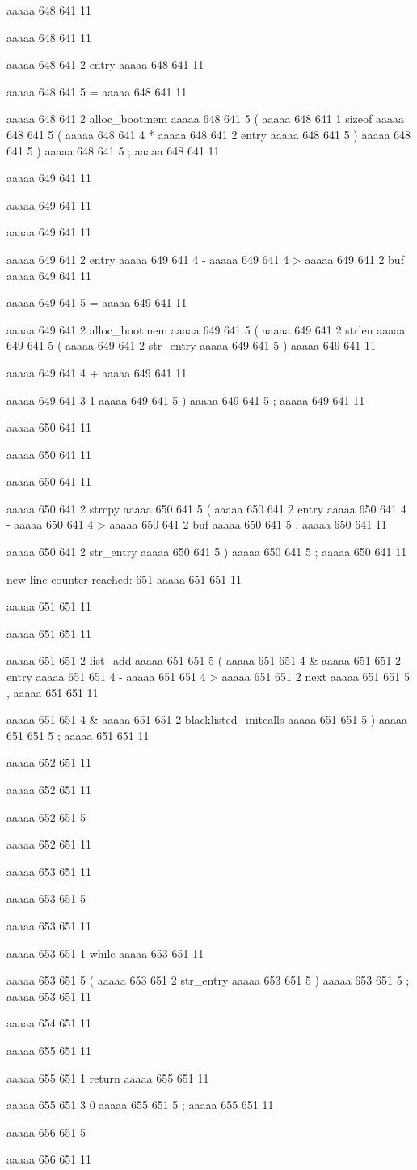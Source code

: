 {{{aaaaa 648 641
11
	
aaaaa 648 641
11
	
aaaaa 648 641
2
entry
aaaaa 648 641
11
 
aaaaa 648 641
5
=
aaaaa 648 641
11
 
aaaaa 648 641
2
alloc_bootmem
aaaaa 648 641
5
(
aaaaa 648 641
1
sizeof
aaaaa 648 641
5
(
aaaaa 648 641
4
*
aaaaa 648 641
2
entry
aaaaa 648 641
5
)
aaaaa 648 641
5
)
aaaaa 648 641
5
;
aaaaa 648 641
11


aaaaa 649 641
11
	
aaaaa 649 641
11
	
aaaaa 649 641
11
	
aaaaa 649 641
2
entry
aaaaa 649 641
4
-
aaaaa 649 641
4
>
aaaaa 649 641
2
buf
aaaaa 649 641
11
 
aaaaa 649 641
5
=
aaaaa 649 641
11
 
aaaaa 649 641
2
alloc_bootmem
aaaaa 649 641
5
(
aaaaa 649 641
2
strlen
aaaaa 649 641
5
(
aaaaa 649 641
2
str_entry
aaaaa 649 641
5
)
aaaaa 649 641
11
 
aaaaa 649 641
4
+
aaaaa 649 641
11
 
aaaaa 649 641
3
1
aaaaa 649 641
5
)
aaaaa 649 641
5
;
aaaaa 649 641
11


aaaaa 650 641
11
	
aaaaa 650 641
11
	
aaaaa 650 641
11
	
aaaaa 650 641
2
strcpy
aaaaa 650 641
5
(
aaaaa 650 641
2
entry
aaaaa 650 641
4
-
aaaaa 650 641
4
>
aaaaa 650 641
2
buf
aaaaa 650 641
5
,
aaaaa 650 641
11
 
aaaaa 650 641
2
str_entry
aaaaa 650 641
5
)
aaaaa 650 641
5
;
aaaaa 650 641
11


new line counter reached: 651
aaaaa 651 651
11
	
aaaaa 651 651
11
	
aaaaa 651 651
11
	
aaaaa 651 651
2
list_add
aaaaa 651 651
5
(
aaaaa 651 651
4
&
aaaaa 651 651
2
entry
aaaaa 651 651
4
-
aaaaa 651 651
4
>
aaaaa 651 651
2
next
aaaaa 651 651
5
,
aaaaa 651 651
11
 
aaaaa 651 651
4
&
aaaaa 651 651
2
blacklisted_initcalls
aaaaa 651 651
5
)
aaaaa 651 651
5
;
aaaaa 651 651
11


aaaaa 652 651
11
	
aaaaa 652 651
11
	
aaaaa 652 651
5
}
aaaaa 652 651
11


aaaaa 653 651
11
	
aaaaa 653 651
5
}
aaaaa 653 651
11
 
aaaaa 653 651
1
while
aaaaa 653 651
11
 
aaaaa 653 651
5
(
aaaaa 653 651
2
str_entry
aaaaa 653 651
5
)
aaaaa 653 651
5
;
aaaaa 653 651
11


aaaaa 654 651
11


aaaaa 655 651
11
	
aaaaa 655 651
1
return
aaaaa 655 651
11
 
aaaaa 655 651
3
0
aaaaa 655 651
5
;
aaaaa 655 651
11


aaaaa 656 651
5
}
aaaaa 656 651
11


